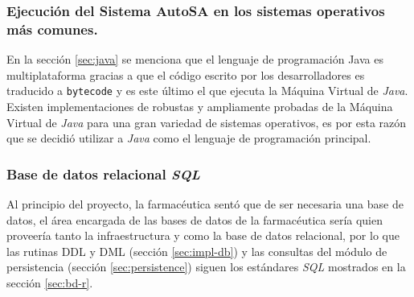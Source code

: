 \subsubsection{Ejecución del Sistema AutoSA en los sistemas operativos más comunes.}
En la sección \ref{sec:java} se menciona que el lenguaje de programación Java es multiplataforma gracias a que el código escrito por los desarrolladores es traducido a \texttt{bytecode} y es este último el que ejecuta la Máquina Virtual de \textit{Java}. Existen implementaciones de robustas y ampliamente probadas de la Máquina Virtual de \textit{Java} para una gran variedad de sistemas operativos, es por esta razón que se decidió utilizar a \textit{Java} como el lenguaje de programación principal.

\subsubsection{Base de datos relacional \textit{SQL}}
Al principio del proyecto, la farmacéutica sentó que de ser necesaria una base de datos, el área encargada de las bases de datos de la farmacéutica sería quien proveería tanto la infraestructura y como la base de datos relacional, por lo que las rutinas DDL y DML (sección \ref{sec:impl-db}) y las consultas del módulo de persistencia (sección \ref{sec:persistence}) siguen los estándares \textit{SQL} mostrados en la sección \ref{sec:bd-r}.

